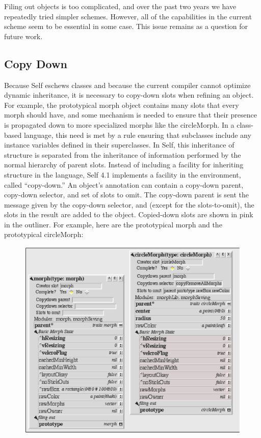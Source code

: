 \documentclass[letterpaper,10pt,english]{sphinxmanual}
\begin{document}
Filing out objects is too complicated, and over the past two years we have repeatedly tried simpler
schemes. However, all of the capabilities in the current scheme seem to be essential in some case.
This issue remains as a question for future work.


\subsection{Copy Down}
\label{howtoprg:copy-down}
Because Self eschews classes and because the current compiler cannot optimize dynamic inheritance,
it is necessary to copy-down slots when refining an object. For example, the prototypical
morph object contains many slots that every morph should have, and some mechanism is needed
to ensure that their presence is propagated down to more specialized morphs like the circleMorph.
In a class-based language, this need is met by a rule ensuring that subclasses include any instance
variables defined in their superclasses. In Self, this inheritance of structure is separated from the
inheritance of information performed by the normal hierarchy of parent slots. Instead of including
a facility for inheriting structure in the language, Self 4.1 implements a facility in the environment,
called “copy-down.” An object’s annotation can contain a copy-down parent, copy-down selector,
and set of slots to omit. The copy-down parent is sent the message given by the copy-down selector,
and (except for the slots-to-omit), the slots in the result are added to the object. Copied-down
slots are shown in pink in the outliner. For example, here are the prototypical morph and the prototypical
circleMorph:
\begin{figure}[htbp]\begin{flushleft}

\includegraphics{Pgm_Env_Image32.png}
\end{flushleft}\end{figure}
\end{document}
